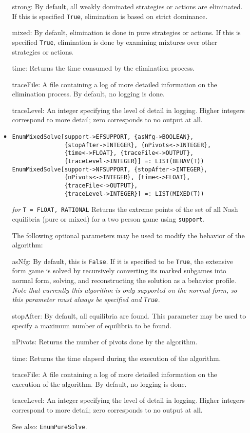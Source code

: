 \begin{itemize}
\bd
\item [strong:] By default, all weakly dominated strategies or actions
are eliminated.  If this is specified \verb+True+, elimination is based
on strict dominance.
\item [mixed:] By default, elimination is done in pure strategies or
actions.  If this is specified \verb+True+, elimination is done by
examining mixtures over other strategies or actions.
\item [time:] Returns the time consumed by the elimination process.
\item [traceFile:] A file containing a log of more detailed information
on the elimination process.  By default, no logging is done.
\item [traceLevel:] An integer specifying the level of detail in logging.
Higher integers correspond to more detail; zero corresponds to no output
at all.
\ed
\ed

\item{}
\protect \large \begin{verbatim}
EnumMixedSolve[support->EFSUPPORT, {asNfg->BOOLEAN}, 
               {stopAfter->INTEGER}, {nPivots<->INTEGER}, 
               {time<->FLOAT}, {traceFile<->OUTPUT},
               {traceLevel->INTEGER}] =: LIST(BEHAV(T))
EnumMixedSolve[support->NFSUPPORT, {stopAfter->INTEGER},
               {nPivots<->INTEGER}, {time<->FLOAT},
               {traceFile<->OUTPUT},
               {traceLevel->INTEGER}] =: LIST(MIXED(T))
\end{verbatim}\normalsize

{\it for} {\tt T = FLOAT, RATIONAL}
\bd
Returns the extreme points of the set of all Nash equilibria (pure or
mixed) for a two person game using \verb+support+.

The following optional parameters may be used to modify the behavior
of the algorithm:
\bd
\item
[asNfg:] By default, this is \verb+False+.  If it is specified to be
\verb+True+, the extensive form game is solved by recursively converting
its marked subgames into normal form, solving, and reconstructing the
solution as a behavior profile.  {\it Note that currently this algorithm
is only supported on the normal form, so this parameter
must always be specified and {\tt True}.} 
\item
[stopAfter:] By default, all equilibria are found.  This parameter may
be used to specify a maximum number of equilibria to be found.
\item
[nPivots:] Returns the number of pivots done by the
algorithm.
\item
[time:] Returns the time elapsed during the execution
of the algorithm.
\item
[traceFile:] A file containing a log of more detailed information on the
execution of the algorithm.  By default, no logging is done.
\item
[traceLevel:] An integer specifying the level of detail in logging.
Higher integers correspond to more detail; zero corresponds to no output
at all.
\ed
\item [See also:] \verb+EnumPureSolve+.
\ed


\end{itemize}
